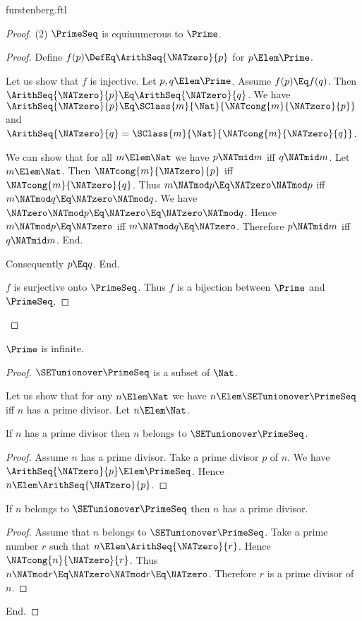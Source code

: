 \documentclass{stex}
\begin{document}
\begin{smodule}{furstenberg.ftl}
\begin{forthel}
\begin{proof}
    (2) $\PrimeSeq$ is equinumerous to $\Prime$.
    \begin{proof}
      Define $f(p) \DefEq \ArithSeq{\NATzero}{p}$ for $p \Elem \Prime$.

      Let us show that $f$ is injective.
        Let $p, q \Elem \Prime$.
        Assume $f(p) \Eq f(q)$.
        Then $\ArithSeq{\NATzero}{p} \Eq \ArithSeq{\NATzero}{q}$.
        We have $\ArithSeq{\NATzero}{p} \Eq \SClass{m}{\Nat}{\NATcong{m}{\NATzero}{p}}$ and
        $\ArithSeq{\NATzero}{q} =\linebreak \SClass{m}{\Nat}{\NATcong{m}{\NATzero}{q}}$.

        We can show that for all $m \Elem \Nat$ we have $p \NATmid m$ iff $q \NATmid m$.
          Let $m \Elem \Nat$.
          Then $\NATcong{m}{\NATzero}{p}$ iff $\NATcong{m}{\NATzero}{q}$.
          Thus $m \NATmod p \Eq \NATzero \NATmod p$ iff $m \NATmod q \Eq\linebreak \NATzero \NATmod q$.
          We have $\NATzero \NATmod p \Eq \NATzero \Eq \NATzero \NATmod q$.
          Hence $m \NATmod p \Eq \NATzero$ iff $m \NATmod q \Eq\linebreak \NATzero$.
          Therefore $p \NATmid m$ iff $q \NATmid m$.
        End.

        Consequently $p \Eq q$.
      End.

      $f$ is surjective onto $\PrimeSeq$.
      Thus $f$ is a bijection between $\Prime$ and $\PrimeSeq$.
    \end{proof}
  \end{proof}

  \begin{theorem}[title=Furstenberg,name=Furstenberg]
    $\Prime$ is infinite.
  \end{theorem}
  \begin{proof}
    $\SETunionover \PrimeSeq$ is a subset of $\Nat$.

    Let us show that for any $n \Elem \Nat$ we have $n \Elem \SETunionover \PrimeSeq$ iff $n$
    has a prime divisor.
      Let $n \Elem \Nat$.

      If $n$ has a prime divisor then $n$ belongs to $\SETunionover \PrimeSeq$.
      \begin{proof}
        Assume $n$ has a prime divisor.
        Take a prime divisor $p$ of $n$.
        We have $\ArithSeq{\NATzero}{p} \Elem \PrimeSeq$.
        Hence $n \Elem \ArithSeq{\NATzero}{p}$.
      \end{proof}

      If $n$ belongs to $\SETunionover \PrimeSeq$ then $n$ has a prime divisor.
      \begin{proof}
        Assume that $n$ belongs to $\SETunionover \PrimeSeq$.
        Take a prime number $r$ such that $n \Elem \ArithSeq{\NATzero}{r}$.
        Hence $\NATcong{n}{\NATzero}{r}$.
        Thus $n \NATmod r \Eq \NATzero \NATmod r \Eq \NATzero$.
        Therefore $r$ is a prime divisor of $n$.
      \end{proof}
    End.


\end{proof}
\end{forthel}
\end{smodule}
\end{document}
